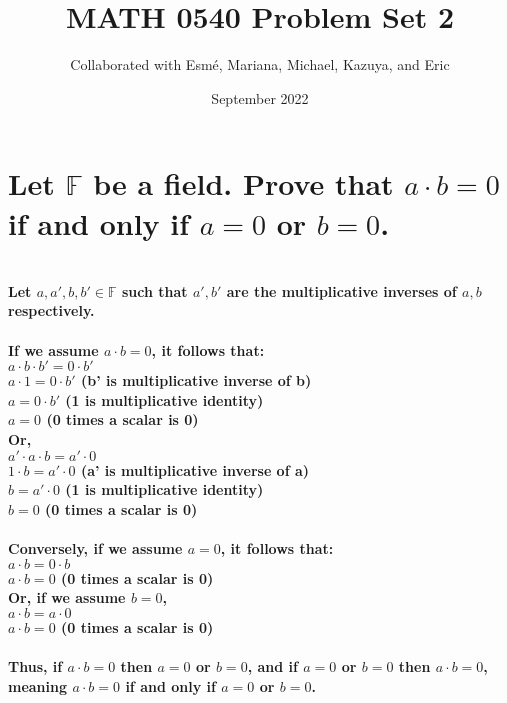 \documentclass{article}
\title{MATH 0540 Problem Set 2}
\author{Collaborated with Esmé, Mariana, Michael, Kazuya, and Eric}
\date{September 2022}
\begin{document}
\maketitle

\section{Let \(\mathds{F}\) be a field. Prove that \(a \cdot b = 0\) if and only if \(a = 0\) or \(b = 0\).}

\paragraph{\large
\\Let \(a, a', b, b' \in \mathds{F}\) such that \(a', b'\) are the multiplicative inverses of \(a, b\) respectively.
\\\\If we assume \(a \cdot b = 0\), it follows that:
\\\indent \(a \cdot b \cdot b' = 0 \cdot b'\)
\\\indent \(a \cdot 1 = 0 \cdot b'\) (b' is multiplicative inverse of b)
\\\indent \(a = 0 \cdot b'\) (1 is multiplicative identity)
\\\indent \(a = 0\) (0 times a scalar is 0)
\\ Or,
\\\indent \(a' \cdot a \cdot b = a' \cdot 0\)
\\\indent \(1 \cdot b = a' \cdot 0\) (a' is multiplicative inverse of a)
\\\indent \(b = a' \cdot 0\) (1 is multiplicative identity)
\\\indent \(b = 0\) (0 times a scalar is 0)}

\paragraph{\large
Conversely, if we assume \(a = 0\), it follows that:
\\\indent \(a \cdot b = 0 \cdot b\)
\\\indent \(a \cdot b = 0\) (0 times a scalar is 0)
\\ Or, if we assume \(b = 0\),
\\\indent \(a \cdot b = a \cdot 0\)
\\\indent \(a \cdot b = 0\) (0 times a scalar is 0)}

\paragraph{\large
Thus, if \(a \cdot b = 0\) then \(a = 0\) or \(b = 0\), and if \(a = 0\) or \(b = 0\) then \(a \cdot b = 0\), meaning \(a \cdot b = 0\) if and only if \(a = 0\) or \(b = 0\).}
\end{document}
